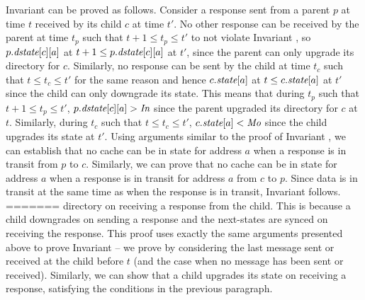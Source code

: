 Invariant  can be proved as follows. Consider a response
sent from a parent $p$ at time $t$ received by its child $c$ at time $t'$. No
other response can be received by the parent at time $t_p$ such that $t+1 \le
t_p \le t'$ to not violate Invariant , so $p.\textit{dstate}[c][a]$ at
$t+1 \le p.\textit{dstate}[c][a]$ at $t'$, since the parent can only upgrade its
directory for $c$. Similarly, no response can be sent by the child at time
$t_c$ such that $t \le t_c \le t'$ for the same reason and hence $c.\textit{state}[a]$
at $t \le c.\textit{state}[a]$ at $t'$ since the child can only downgrade its state.
This means that during $t_p$ such that $t+1 \le t_p \le t'$, $p.\textit{dstate}[c][a]
> \textit{In}$ since the parent upgraded its directory for $c$ at $t$. Similarly,
during $t_c$ such that $t \le t_c \le t'$, $c.\textit{state}[a] < \textit{Mo}$ since the
child upgrades its state at $t'$. Using arguments similar to the proof of
Invariant , we can establish that no cache can be in \Mo{}
state for address $a$ when a response is in transit from $p$ to $c$.
Similarly, we can prove that no cache can be in \Mo{} state for address $a$
when a response is in transit for address $a$ from $c$ to $p$. Since data is in
transit at the same time as when the response is in transit, Invariant
 follows.
=======
directory on receiving a response from the child. This is because a child
downgrades on sending a response and the next-states are synced on receiving
the response.  This proof uses exactly the same arguments presented above to
prove Invariant  -- we prove by considering the last
message sent or received at the child before $t$ (and the case when no message
has been sent or received). Similarly, we can show that a child upgrades its
state on receiving a response, satisfying the conditions in the previous paragraph.


